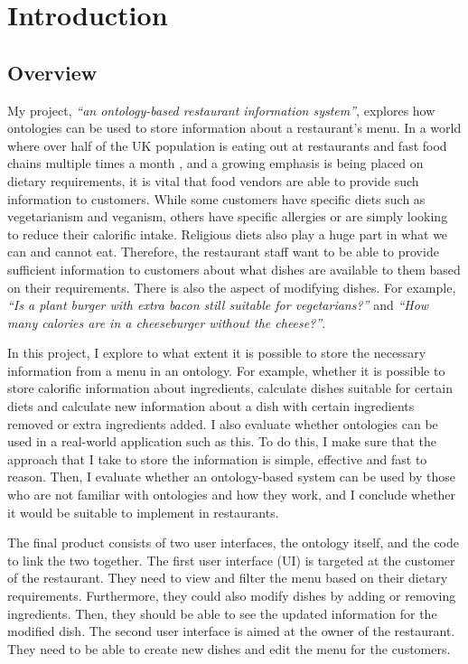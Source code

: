 \chapter{Introduction}

\section{Overview}

My project, \textit{``an ontology-based restaurant information system''}, explores how ontologies can be used to store information about a restaurant's menu. In a world where over half of the UK population is eating out at restaurants and fast food chains multiple times a month \cite{wunsch_2022}, and a growing emphasis is being placed on dietary requirements, it is vital that food vendors are able to provide such information to customers. While some customers have specific diets such as vegetarianism and veganism, others have specific allergies or are simply looking to reduce their calorific intake. Religious diets also play a huge part in what we can and cannot eat. Therefore, the restaurant staff want to be able to provide sufficient information to customers about what dishes are available to them based on their requirements. There is also the aspect of modifying dishes. For example, \textit{``Is a plant burger with extra bacon still suitable for vegetarians?''} and \textit{``How many calories are in a cheeseburger without the cheese?''}.

In this project, I explore to what extent it is possible to store the necessary information from a menu in an ontology. For example, whether it is possible to store calorific information about ingredients, calculate dishes suitable for certain diets and calculate new information about a dish with certain ingredients removed or extra ingredients added. I also evaluate whether ontologies can be used in a real-world application such as this. To do this, I make sure that the approach that I take to store the information is simple, effective and fast to reason. Then, I evaluate whether an ontology-based system can be used by those who are not familiar with ontologies and how they work, and I conclude whether it would be suitable to implement in restaurants.

The final product consists of two user interfaces, the ontology itself, and the code to link the two together. The first user interface (UI) is targeted at the customer of the restaurant. They need to view and filter the menu based on their dietary requirements. Furthermore, they could also modify dishes by adding or removing ingredients. Then, they should be able to see the updated information for the modified dish. The second user interface is aimed at the owner of the restaurant. They need to be able to create new dishes and edit the menu for the customers.

